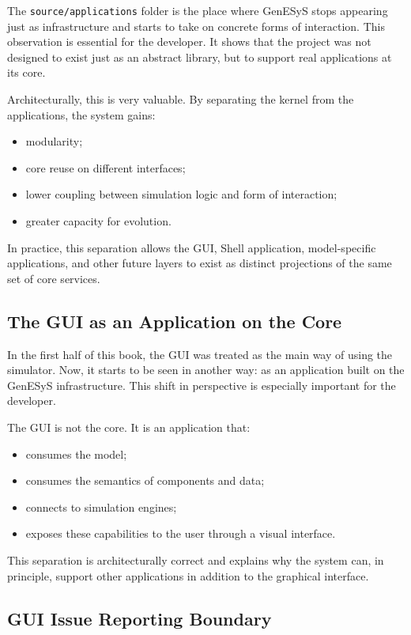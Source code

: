 The \texttt{source/applications} folder is the place where GenESyS stops appearing just as infrastructure and starts to take on concrete forms of interaction. This observation is essential for the developer. It shows that the project was not designed to exist just as an abstract library, but to support real applications at its core.

Architecturally, this is very valuable. By separating the kernel from the applications, the system gains:
\begin{itemize}
 \item modularity;
 \item core reuse on different interfaces;
 \item lower coupling between simulation logic and form of interaction;
 \item greater capacity for evolution.
\end{itemize}

In practice, this separation allows the GUI, Shell application, model-specific applications, and other future layers to exist as distinct projections of the same set of core services.

\subsection{The GUI as an Application on the Core}
\label{subsec:cap10_gui_como_aplicacao_sobre_nucleo}

In the first half of this book, the GUI was treated as the main way of using the simulator. Now, it starts to be seen in another way: as an application built on the GenESyS infrastructure. This shift in perspective is especially important for the developer.

The GUI is not the core. It is an application that:
\begin{itemize}
 \item consumes the model;
 \item consumes the semantics of components and data;
 \item connects to simulation engines;
 \item exposes these capabilities to the user through a visual interface.
\end{itemize}

This separation is architecturally correct and explains why the system can, in principle, support other applications in addition to the graphical interface.

\subsection{GUI Issue Reporting Boundary}
\label{subsec:cap10_issue_reporting}

